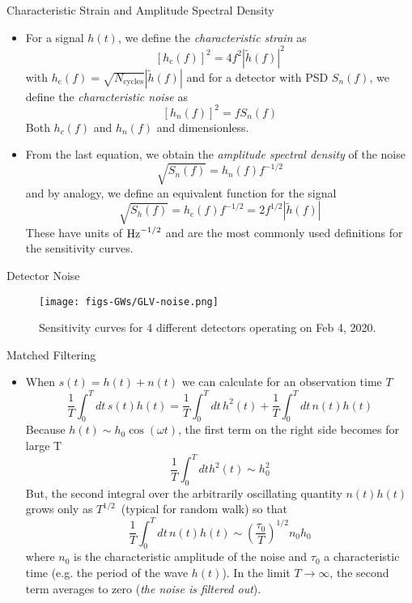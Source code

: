 \documentclass[size=11pt,style=paintings]{powerdot}
\begin{document}
 \begin{slide}{Characteristic Strain and Amplitude Spectral Density}
 \begin{itemize}
 \item For a signal $h(t)$, we define the \textit{characteristic strain} as
\vskip -0.2cm
 $$
\left[h_{\mathrm{c}}(f)\right]^{2}=4 f^{2}|\tilde{h}(f)|^{2}
$$
with $ h_{\mathrm{c}}(f)=\sqrt{N_{\mathrm{cycles}}}|\tilde{h}(f)|$ and for a detector with PSD  $S_{n}(f)$, we define the \textit{characteristic noise } as
\vskip -0.2cm
$$
\left[h_{n}(f)\right]^{2}=f S_{n}(f)
$$
Both $h_c(f)$ and $h_n(f)$ and dimensionless.
\vskip 0.2cm
\item From the last equation, we obtain the \textit{amplitude spectral density} of the noise
\vskip -0.5cm
$$
\boxed{\sqrt{S_{n}(f)}=h_{n}(f) f^{-1 / 2}}
$$
and by analogy, we define an equivalent function for the signal 
$$
\boxed{\sqrt{S_{h}(f)}=h_{\mathrm{c}}(f) f^{-1 / 2}=2 f^{1 / 2}|\tilde{h}(f)|}
$$
These have units of ${\rm Hz}^{-1/2}$ and are the most commonly used definitions for the sensitivity curves. 

 \end{itemize}
 \end{slide}
 
 \begin{slide}{Detector Noise}
 \begin{figure}
 \centering
   \texttt{[image: figs-GWs/GLV-noise.png]}
  \caption{Sensitivity curves for 4 different detectors operating on Feb 4, 2020.}
\label{fig:polarization}
\end{figure}
 \end{slide}
  
  \begin{slide}{Matched Filtering}
 \begin{itemize}
 \item When \(s(t)=h(t)+n(t)\) we can calculate for an observation time $T$
 $$\frac{1}{T} \int_{0}^{T} d t\, s(t) h(t)=\frac{1}{T} \int_{0}^{T} d t\, h^{2}(t)+\frac{1}{T} \int_{0}^{T} d t\, n(t) h(t)$$
Because $h(t)\sim h_0 \cos(\omega t)$, the first term on the right side becomes for large T
$$\frac{1}{T} \int_{0}^{T} d t h^{2}(t) \sim h_{0}^{2}$$
But, the second integral
over the arbitrarily oscillating quantity $n(t)h(t)$ grows only as $T^{1/2}$\ (typical for random walk) so that
$$\frac{1}{T} \int_{0}^{T} d t\, n(t) h(t) \sim\left(\frac{\tau_{0}}{T}\right)^{1 / 2} n_{0} h_{0}$$
where $n_0$ is the characteristic amplitude of the noise and $\tau_0$ a characteristic time (e.g. the period of the wave $h(t)$).
In the limit $T\rightarrow \infty$, the second term averages to zero (\textit{the noise is filtered out}). \end{itemize}
 \end{slide}
 
\end{document}
